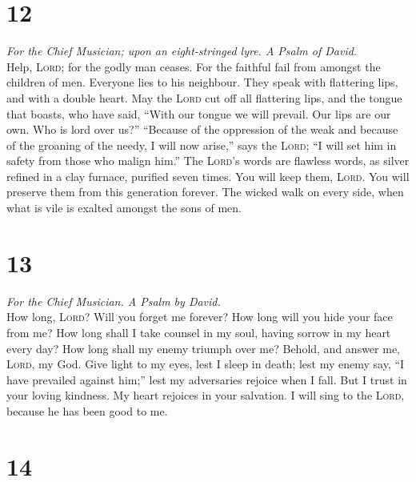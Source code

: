 \hypertarget{section-11}{%
\section{12}\label{section-11}}

\emph{For the Chief Musician; upon an eight-stringed lyre. A Psalm of
David.}\\
 Help, \textsc{Lord}; for the godly man ceases. For the
faithful fail from amongst the children of men.  Everyone
lies to his neighbour. They speak with flattering lips, and with a
double heart.  May the \textsc{Lord} cut off all
flattering lips, and the tongue that boasts,  who have
said, ``With our tongue we will prevail. Our lips are our own. Who is
lord over us?''  ``Because of the oppression of the weak
and because of the groaning of the needy, I will now arise,'' says the
\textsc{Lord}; ``I will set him in safety from those who malign him.''
 The \textsc{Lord}'s words are flawless words, as silver
refined in a clay furnace, purified seven times.  You will
keep them, \textsc{Lord}. You will preserve them from this generation
forever.  The wicked walk on every side, when what is vile
is exalted amongst the sons of men.

\hypertarget{section-12}{%
\section{13}\label{section-12}}

\emph{For the Chief Musician. A Psalm by David.}\\
 How long, \textsc{Lord}? Will you forget me forever? How
long will you hide your face from me?  How long shall I
take counsel in my soul, having sorrow in my heart every day? How long
shall my enemy triumph over me?  Behold, and answer me,
\textsc{Lord}, my God. Give light to my eyes, lest I sleep in death;
 lest my enemy say, ``I have prevailed against him;'' lest
my adversaries rejoice when I fall.  But I trust in your
loving kindness. My heart rejoices in your salvation.  I
will sing to the \textsc{Lord}, because he has been good to me.

\hypertarget{section-13}{%
\section{14}\label{section-13}}

